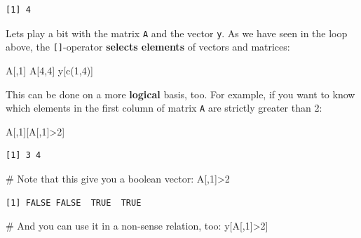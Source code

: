 \documentclass[
  letterpaper,
  DIV=11,
  numbers=noendperiod]{scrreprt}
\newenvironment{Shaded}{\begin{snugshade}}{\end{snugshade}}
\newcommand{\CommentTok}[1]{\textcolor[rgb]{0.37,0.37,0.37}{#1}}
\newcommand{\DecValTok}[1]{\textcolor[rgb]{0.68,0.00,0.00}{#1}}
\newcommand{\FunctionTok}[1]{\textcolor[rgb]{0.28,0.35,0.67}{#1}}
\newcommand{\NormalTok}[1]{\textcolor[rgb]{0.00,0.23,0.31}{#1}}
\newcommand{\SpecialCharTok}[1]{\textcolor[rgb]{0.37,0.37,0.37}{#1}}
\theoremstyle{definition}
\theoremstyle{plain}
\theoremstyle{plain}
\theoremstyle{remark}
\begin{document}
\begin{verbatim}
[1] 4
\end{verbatim}

Lets play a bit with the matrix \texttt{A} and the vector \texttt{y}. As
we have seen in the loop above, the \texttt{{[}{]}}-operator
\textbf{selects elements} of vectors and matrices:

\begin{Shaded}
\begin{Highlighting}[]
\NormalTok{A[,}\DecValTok{1}\NormalTok{]}
\NormalTok{A[}\DecValTok{4}\NormalTok{,}\DecValTok{4}\NormalTok{]}
\NormalTok{y[}\FunctionTok{c}\NormalTok{(}\DecValTok{1}\NormalTok{,}\DecValTok{4}\NormalTok{)]}
\end{Highlighting}
\end{Shaded}

This can be done on a more \textbf{logical} basis, too. For example, if
you want to know which elements in the first column of matrix \texttt{A}
are strictly greater than 2:

\begin{Shaded}
\begin{Highlighting}[]
\NormalTok{A[,}\DecValTok{1}\NormalTok{][A[,}\DecValTok{1}\NormalTok{]}\SpecialCharTok{\textgreater{}}\DecValTok{2}\NormalTok{]}
\end{Highlighting}
\end{Shaded}

\begin{verbatim}
[1] 3 4
\end{verbatim}

\begin{Shaded}
\begin{Highlighting}[]
\CommentTok{\# Note that this give you a boolean vector:}
\NormalTok{A[,}\DecValTok{1}\NormalTok{]}\SpecialCharTok{\textgreater{}}\DecValTok{2}
\end{Highlighting}
\end{Shaded}

\begin{verbatim}
[1] FALSE FALSE  TRUE  TRUE
\end{verbatim}

\begin{Shaded}
\begin{Highlighting}[]
\CommentTok{\# And you can use it in a non{-}sense relation, too:}
\NormalTok{y[A[,}\DecValTok{1}\NormalTok{]}\SpecialCharTok{\textgreater{}}\DecValTok{2}\NormalTok{]}
\end{Highlighting}
\end{Shaded}
\end{document}
